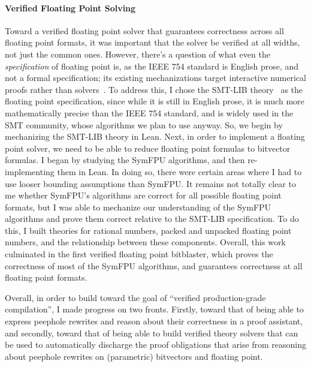 \paragraph{Verified Floating Point Solving}
Toward a verified floating point solver that guarantees correctness across all floating point formats,
it was important that the solver be verified at all widths, not just the common ones.
However, there's a question of what even the \emph{specification} of floating point is,
as the IEEE 754 standard is English prose, and not a formal specification; its existing mechanizations target interactive numerical proofs rather than solvers~\citep{harrison1999machine,boldo2011flocq,isabellefp}.
To address this, I chose the SMT-LIB \qffp{} theory~\citep{extrealsemantics}
as the floating point specification, since while it is still in English prose,
it is much more mathematically precise than the IEEE 754 standard, and is widely used in the SMT community,
whose algorithms we plan to use anyway.
So, we begin by mechanizing the SMT-LIB \qffp{} theory in Lean.
Next, in order to implement a floating point solver, we need to be able to reduce floating point formulas to bitvector formulas.
I began by studying the SymFPU algorithms, and then re-implementing them in Lean.
In doing so, there were certain areas where I had to use looser bounding assumptions than SymFPU.
It remains not totally clear to me whether SymFPU's algorithms are correct for all possible floating point formats,
but I was able to mechanize our understanding of the SymFPU algorithms and prove them correct relative to the SMT-LIB specification.
To do this, I built theories for rational numbers, packed and unpacked floating point numbers, and the relationship between these components.
Overall, this work culminated in the first verified floating point bitblaster,
which proves the correctness of most of the SymFPU algorithms, and guarantees correctness at all floating point formats.


Overall, in order to build toward the goal of ``verified production-grade compilation'',
I made progress on two fronts. Firstly, toward that of being able to express peephole rewrites
and reason about their correctness in a proof assistant, and secondly,
toward that of being able to build verified theory solvers that can be used to automatically discharge
the proof obligations that arise from reasoning about peephole rewrites on (parametric) bitvectors and floating point.

